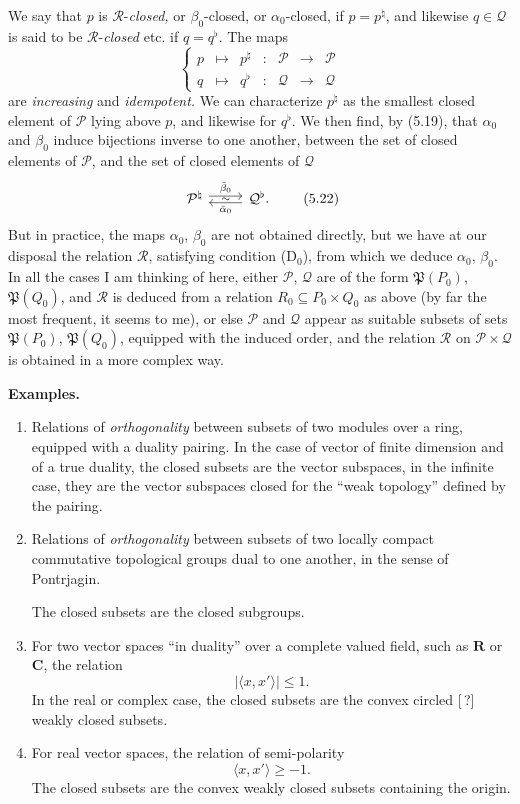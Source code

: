\documentclass[11pt]{article}
\newcommand{\msp}[1]{\marginpar{\footnotesize [#1]}}
\newcommand{\cP}{\mathcal{P}}
\newcommand{\cQ}{\mathcal{Q}}
\newcommand{\cR}{\mathcal{R}}
\newcommand{\fP}{\mathfrak{P}}
\begin{document}
We say that $p$ is $\cR$-\textit{closed,} or $\beta_0$-closed, or $\alpha_0$-closed, if $p = p^{\natural}$, and likewise $q \in \cQ$ is said to be $\cR$-\textit{closed} etc. if $q = q^{\flat}$. The maps
\[
\left\{
\begin{array}{ccccccc}
p & \longmapsto & p^{\natural} & : & \cP & \longrightarrow & \cP\\[1ex]
q & \longmapsto & q^{\flat} & : & \cQ & \longrightarrow & \cQ
\end{array}
\right.
\tag*{(5.21)}
\]
are \textit{increasing} and \textit{idempotent.} We can characterize $p^{\natural}$ as the smallest closed element of $\cP$ lying above $p$, and likewise for $q^{\flat}$. We then find, by (5.19), that $\alpha_0$ and $\beta_0$ induce bijections inverse to one another,
\msp{78}
between the set of closed elements of $\cP$, and the set of closed elements of $\cQ$
\[
\begin{tikzcd}
\cP^{\natural} \arrow[r, shift left, "\bar{\beta}_0"] \arrow[r, phantom, "\scriptstyle\sim"] & \cQ^{\flat}. \arrow[l, shift left, "\bar{\alpha}_0"]
\end{tikzcd}
\tag*{(5.22)}
\]
But in practice, the maps $\alpha_0$, $\beta_0$ are not obtained directly, but we have at our disposal the relation $\cR$, satisfying condition (D$_0$), from which we deduce $\alpha_0$, $\beta_0$. In all the cases I am thinking of here, either $\cP$, $\cQ$ are of the form $\fP(P_0)$, $\fP(Q_0)$, and $\cR$ is deduced from a relation $R_0 \subseteq P_0 \times Q_0$ as above (by far the most frequent, it seems to me), or else $\cP$ and $\cQ$ appear as suitable subsets of sets $\fP(P_0)$, $\fP(Q_0)$, equipped with the induced order, and the relation $\cR$ on $\cP \times \cQ$ is obtained in a more complex way.

\noindent\textbf{Examples.}
\begin{enumerate}[label={\arabic*)}]
\item Relations of \textit{orthogonality} between subsets of two modules over a ring, equipped with a duality pairing. In the case of vector of finite dimension and of a true duality, the closed subsets are the vector subspaces, in the infinite case, they are the vector subspaces closed for the ``weak topology'' defined by the pairing.
\item Relations of \textit{orthogonality} between subsets of two locally compact commutative topological groups dual to one another, in the sense of Pontrjagin.
\msp{79}

The closed subsets are the closed subgroups.
\item For two vector spaces ``in duality'' over a complete valued field, such as $\mathbf{R}$ or $\mathbf{C}$, the relation %
\[
|\langle x, x' \rangle| \leq 1.
\]
In the real or complex case, the closed subsets are the convex circled [\,?] weakly closed subsets.
\item For real vector spaces, the relation of semi-polarity
\[
\langle x, x' \rangle \geq -1.
\]
The closed subsets are the convex weakly closed subsets containing the origin.
\end{enumerate}
\end{document}
